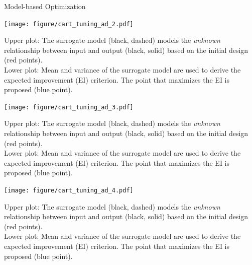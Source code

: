 \documentclass[11pt,compress,t,notes=noshow, xcolor=table]{beamer}
\newenvironment{knitrout}{}{} %
\begin{document}
\begin{vbframe}{Model-based Optimization}
\framebreak 

\begin{knitrout}\scriptsize
{}\color{fgcolor}

{\centering \texttt{[image: figure/cart\_tuning\_ad\_2.pdf]} 

}



\end{knitrout}
  \begin{footnotesize}
Upper plot: The surrogate model (black, dashed) models the \emph{unknown} relationship between input and output (black, solid) based on the initial design (red points).\\
Lower plot: Mean and variance of the surrogate model are used to derive the expected improvement (EI) criterion. The point that maximizes the EI is proposed (blue point). 
\end{footnotesize}
\framebreak

\begin{knitrout}\scriptsize
{}\color{fgcolor}

{\centering \texttt{[image: figure/cart\_tuning\_ad\_3.pdf]} 

}



\end{knitrout}
  \begin{footnotesize}
Upper plot: The surrogate model (black, dashed) models the \emph{unknown} relationship between input and output (black, solid) based on the initial design (red points).\\
Lower plot: Mean and variance of the surrogate model are used to derive the expected improvement (EI) criterion. The point that maximizes the EI is proposed (blue point). 
\end{footnotesize}
\framebreak

\begin{knitrout}\scriptsize
{}\color{fgcolor}

{\centering \texttt{[image: figure/cart\_tuning\_ad\_4.pdf]} 

}



\end{knitrout}
  \begin{footnotesize}
Upper plot: The surrogate model (black, dashed) models the \emph{unknown} relationship between input and output (black, solid) based on the initial design (red points).\\
Lower plot: Mean and variance of the surrogate model are used to derive the expected improvement (EI) criterion. The point that maximizes the EI is proposed (blue point). 
\end{footnotesize}
\framebreak


\end{vbframe}
\end{document}
